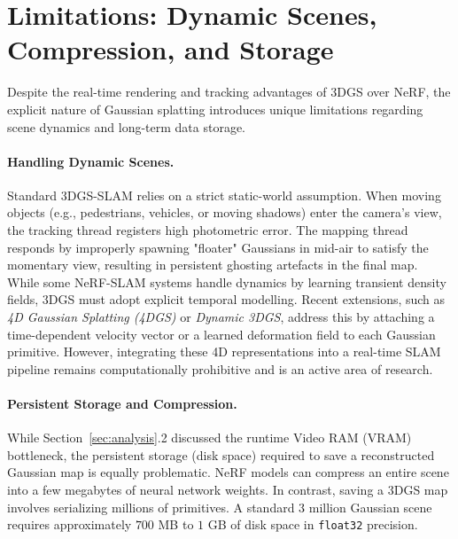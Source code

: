 \section{Limitations: Dynamic Scenes, Compression, and Storage}
\label{sec:limitations}

Despite the real-time rendering and tracking advantages of 3DGS over NeRF, the explicit nature of Gaussian splatting introduces unique limitations regarding scene dynamics and long-term data storage.

\paragraph{Handling Dynamic Scenes.} 
Standard 3DGS-SLAM relies on a strict static-world assumption. When moving objects (e.g., pedestrians, vehicles, or moving shadows) enter the camera's view, the tracking thread registers high photometric error. The mapping thread responds by improperly spawning "floater" Gaussians in mid-air to satisfy the momentary view, resulting in persistent ghosting artefacts in the final map. 
While some NeRF-SLAM systems handle dynamics by learning transient density fields, 3DGS must adopt explicit temporal modelling. Recent extensions, such as \textit{4D Gaussian Splatting (4DGS)} or \textit{Dynamic 3DGS}, address this by attaching a time-dependent velocity vector or a learned deformation field to each Gaussian primitive. However, integrating these 4D representations into a real-time SLAM pipeline remains computationally prohibitive and is an active area of research.

\paragraph{Persistent Storage and Compression.} 
While Section~\ref{sec:analysis}.2 discussed the runtime Video RAM (VRAM) bottleneck, the persistent storage (disk space) required to save a reconstructed Gaussian map is equally problematic. NeRF models can compress an entire scene into a few megabytes of neural network weights. In contrast, saving a 3DGS map involves serializing millions of primitives. A standard 3 million Gaussian scene requires approximately $700$ MB to $1$ GB of disk space in \texttt{float32} precision.

